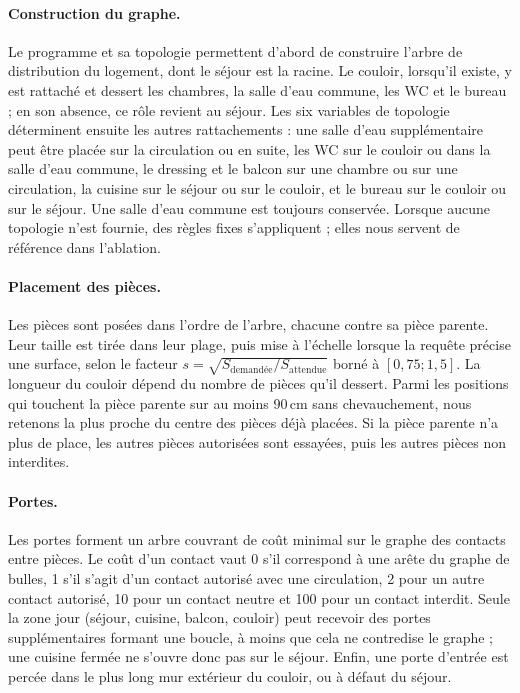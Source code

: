 \documentclass[twocolumn]{ICCKjournal}
\begin{document}
\paragraph{Construction du graphe.}
Le programme et sa topologie permettent d'abord de construire l'arbre
de distribution du logement, dont le séjour est la racine. Le couloir,
lorsqu'il existe, y est rattaché et dessert les chambres, la salle d'eau
commune, les WC et le bureau ; en son absence, ce rôle revient au
séjour. Les six variables de topologie déterminent ensuite les autres
rattachements : une salle d'eau supplémentaire peut être placée sur la
circulation ou en suite, les WC sur le couloir ou dans la salle d'eau
commune, le dressing et le balcon sur une chambre ou sur une
circulation, la cuisine sur le séjour ou sur le couloir, et le bureau
sur le couloir ou sur le séjour. Une salle d'eau commune est toujours
conservée. Lorsque aucune topologie n'est fournie, des règles fixes
s'appliquent ; elles nous servent de référence dans l'ablation.

\paragraph{Placement des pièces.}
Les pièces sont posées dans l'ordre de l'arbre, chacune contre sa pièce
parente. Leur taille est tirée dans leur plage, puis mise à l'échelle
lorsque la requête précise une surface, selon le facteur
$s=\sqrt{S_{\text{demandée}}/S_{\text{attendue}}}$ borné à
$[0{,}75 ; 1{,}5]$. La longueur du couloir dépend du nombre de pièces
qu'il dessert. Parmi les positions qui touchent la pièce parente sur au
moins 90\,cm sans chevauchement, nous retenons la plus proche du centre
des pièces déjà placées. Si la pièce parente n'a plus de place, les
autres pièces autorisées sont essayées, puis les autres pièces non
interdites.

\paragraph{Portes.}
Les portes forment un arbre couvrant de coût minimal sur le graphe des
contacts entre pièces. Le coût d'un contact vaut 0 s'il correspond à une
arête du graphe de bulles, 1 s'il s'agit d'un contact autorisé avec une
circulation, 2 pour un autre contact autorisé, 10 pour un contact neutre
et 100 pour un contact interdit. Seule la zone jour (séjour, cuisine,
balcon, couloir) peut recevoir des portes supplémentaires formant une
boucle, à moins que cela ne contredise le graphe ; une cuisine fermée ne
s'ouvre donc pas sur le séjour. Enfin, une porte d'entrée est percée dans
le plus long mur extérieur du couloir, ou à défaut du séjour.
\end{document}
